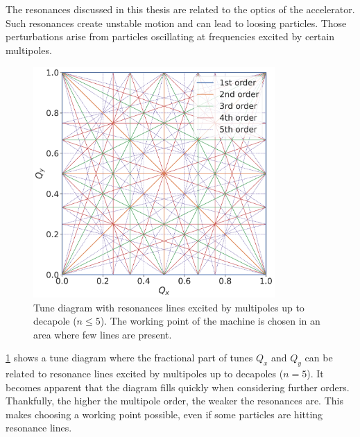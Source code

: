 \section{}


\subsection{}

The resonances discussed in this thesis are related to the optics of the accelerator.
Such resonances create unstable motion and can lead to loosing particles.
Those perturbations arise from particles oscillating at frequencies excited by certain multipoles.

\begin{figure}[!htb]
    \centering
    \includegraphics[width=0.82\textwidth]{images/resonance_diagram_n5.pdf}
    \caption{Tune diagram with resonances lines excited by multipoles up to decapole ($n \leq 5$).
             The working point of the machine is chosen in an area where few lines are present.}
    \label{fig:resonances:diagram_n5}
\end{figure}

\cref{fig:resonances:diagram_n5} shows a tune diagram where the fractional part of tunes $Q_x$ and
$Q_y$ can be related to resonance lines excited by multipoles up to decapoles ($n=5$).
It becomes apparent that the diagram fills quickly when considering further orders.
Thankfully, the higher the multipole order, the weaker the resonances are. This makes choosing a
working point possible, even if some particles are hitting resonance lines.

